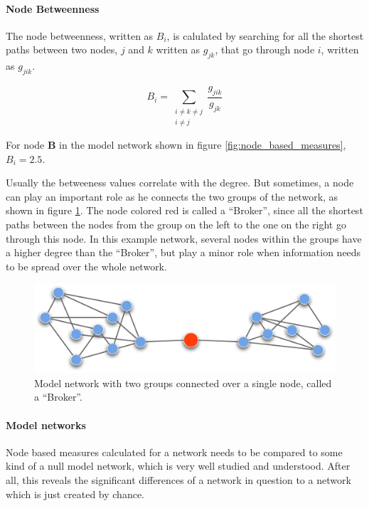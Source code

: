 \paragraph{Node Betweenness}

The node betweenness, written as $B_i$, is calulated by searching for all the shortest paths between two nodes, $j$ and $k$ written as $g_{jk}$, that go through node $i$, written as $g_{jik}$.

\begin{equation}
B_i =	\sum_{
			\substack{i \neq k \neq j \\ i \neq j}
		}
		\frac{g_{jik}}{g_{jk}}
\end{equation}

For node \textbf{B} in the model network shown in figure \ref{fig:node_based_measures}, $B_i = 2.5$.

Usually the betweeness values correlate with the degree. But sometimes, a node can play an important role as he connects the two groups of the network, as shown in figure \ref{fig:broker}. The node colored red is called a ``Broker'', since all the shortest paths between the nodes from the group on the left to the one on the right go through this node. In this example network, several nodes within the groups have a higher degree than the ``Broker'', but play a minor role when information needs to be spread over the whole network. 

\begin{figure}[htpb]
\begin{center}
  \includegraphics[width=.75\textwidth]{assets/pdf/broker.pdf}
  \caption[Model network with two groups]{Model network with two groups connected over a single node, called a ``Broker''.}
  \label{fig:broker}
\end{center}
\end{figure}

\paragraph{Model networks}

Node based measures calculated for a network needs to be compared to some kind of a null model network, which is very well studied and understood. After all, this reveals the significant differences of a network in question to a network which is just created by chance.

